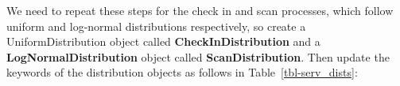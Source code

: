 \documentclass[
  10pt,
  a4paperpaper,
  DIV=11,
  numbers=noendperiod,
  oneside]{scrreprt}
\begin{document}
\begin{table}

\caption{\label{tbl-arr_dist}Arrival Distribution Inputs}


\end{table}%

We need to repeat these steps for the check in and scan processes, which
follow uniform and log-normal distributions respectively, so create a
UniformDistribution object called \textbf{CheckInDistribution} and a
\textbf{LogNormalDistribution} object called \textbf{ScanDistribution}.
Then update the keywords of the distribution objects as follows in
Table~\ref{tbl-serv_dists}:

\begin{table}

\caption{\label{tbl-serv_dists}Check In and Scan Distributions}


\end{table}%
\end{document}
